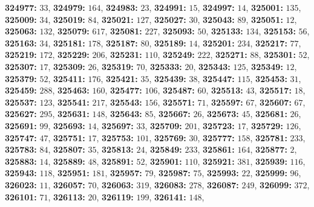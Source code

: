 \textsf{\bfseries 324977:} $33$, \textsf{\bfseries 324979:} $164$, \textsf{\bfseries 324983:} $23$, \textsf{\bfseries 324991:} $15$, \textsf{\bfseries 324997:} $14$, \textsf{\bfseries 325001:} $135$, \textsf{\bfseries 325009:} $34$, \textsf{\bfseries 325019:} $84$, \textsf{\bfseries 325021:} $127$, \textsf{\bfseries 325027:} $30$, \textsf{\bfseries 325043:} $89$, \textsf{\bfseries 325051:} $12$, \textsf{\bfseries 325063:} $132$, \textsf{\bfseries 325079:} $617$, \textsf{\bfseries 325081:} $227$, \textsf{\bfseries 325093:} $50$, \textsf{\bfseries 325133:} $134$, \textsf{\bfseries 325153:} $56$, \textsf{\bfseries 325163:} $34$, \textsf{\bfseries 325181:} $178$, \textsf{\bfseries 325187:} $80$, \textsf{\bfseries 325189:} $14$, \textsf{\bfseries 325201:} $234$, \textsf{\bfseries 325217:} $77$, \textsf{\bfseries 325219:} $172$, \textsf{\bfseries 325229:} $206$, \textsf{\bfseries 325231:} $110$, \textsf{\bfseries 325249:} $222$, \textsf{\bfseries 325271:} $88$, \textsf{\bfseries 325301:} $52$, \textsf{\bfseries 325307:} $17$, \textsf{\bfseries 325309:} $26$, \textsf{\bfseries 325319:} $70$, \textsf{\bfseries 325333:} $20$, \textsf{\bfseries 325343:} $125$, \textsf{\bfseries 325349:} $12$, \textsf{\bfseries 325379:} $52$, \textsf{\bfseries 325411:} $176$, \textsf{\bfseries 325421:} $35$, \textsf{\bfseries 325439:} $38$, \textsf{\bfseries 325447:} $115$, \textsf{\bfseries 325453:} $31$, \textsf{\bfseries 325459:} $288$, \textsf{\bfseries 325463:} $160$, \textsf{\bfseries 325477:} $106$, \textsf{\bfseries 325487:} $60$, \textsf{\bfseries 325513:} $43$, \textsf{\bfseries 325517:} $18$, \textsf{\bfseries 325537:} $123$, \textsf{\bfseries 325541:} $217$, \textsf{\bfseries 325543:} $156$, \textsf{\bfseries 325571:} $71$, \textsf{\bfseries 325597:} $67$, \textsf{\bfseries 325607:} $67$, \textsf{\bfseries 325627:} $295$, \textsf{\bfseries 325631:} $148$, \textsf{\bfseries 325643:} $85$, \textsf{\bfseries 325667:} $26$, \textsf{\bfseries 325673:} $45$, \textsf{\bfseries 325681:} $26$, \textsf{\bfseries 325691:} $99$, \textsf{\bfseries 325693:} $14$, \textsf{\bfseries 325697:} $33$, \textsf{\bfseries 325709:} $201$, \textsf{\bfseries 325723:} $17$, \textsf{\bfseries 325729:} $126$, \textsf{\bfseries 325747:} $47$, \textsf{\bfseries 325751:} $17$, \textsf{\bfseries 325753:} $101$, \textsf{\bfseries 325769:} $30$, \textsf{\bfseries 325777:} $158$, \textsf{\bfseries 325781:} $233$, \textsf{\bfseries 325783:} $84$, \textsf{\bfseries 325807:} $35$, \textsf{\bfseries 325813:} $24$, \textsf{\bfseries 325849:} $233$, \textsf{\bfseries 325861:} $164$, \textsf{\bfseries 325877:} $2$, \textsf{\bfseries 325883:} $14$, \textsf{\bfseries 325889:} $48$, \textsf{\bfseries 325891:} $52$, \textsf{\bfseries 325901:} $110$, \textsf{\bfseries 325921:} $381$, \textsf{\bfseries 325939:} $116$, \textsf{\bfseries 325943:} $118$, \textsf{\bfseries 325951:} $181$, \textsf{\bfseries 325957:} $79$, \textsf{\bfseries 325987:} $75$, \textsf{\bfseries 325993:} $22$, \textsf{\bfseries 325999:} $96$, \textsf{\bfseries 326023:} $11$, \textsf{\bfseries 326057:} $70$, \textsf{\bfseries 326063:} $319$, \textsf{\bfseries 326083:} $278$, \textsf{\bfseries 326087:} $249$, \textsf{\bfseries 326099:} $372$, \textsf{\bfseries 326101:} $71$, \textsf{\bfseries 326113:} $20$, \textsf{\bfseries 326119:} $199$, \textsf{\bfseries 326141:} $148$, 
